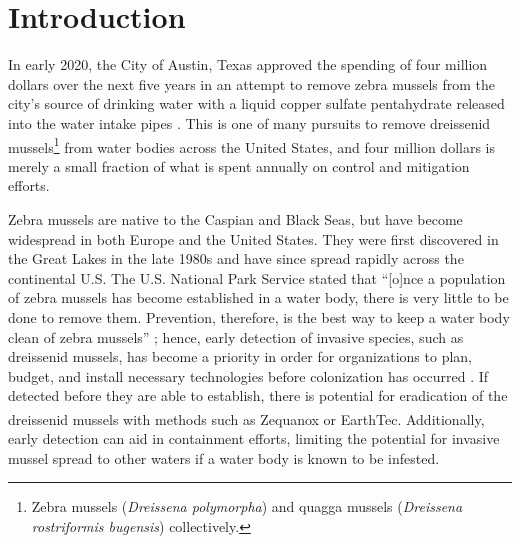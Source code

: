 \documentclass[12pt]{article}\usepackage[]{graphicx}\usepackage[]{color}
\begin{document}
\newpage

\doublespacing

\section{Introduction}

In early 2020, the City of Austin, Texas approved the spending of four million dollars over the next five years in an attempt to remove zebra mussels from the city's source of drinking water with a liquid copper sulfate pentahydrate released into the water intake pipes \cite{CBS:Austin}. This is one of many pursuits to remove dreissenid mussels\footnote{Zebra mussels (\textit{Dreissena polymorpha}) and quagga mussels (\textit{Dreissena rostriformis bugensis}) collectively.} from water bodies across the United States, and four million dollars is merely a small fraction of what is spent annually on control and mitigation efforts.

Zebra mussels are native to the Caspian and Black Seas, but have become widespread in both Europe and the United States. They were first discovered in the Great Lakes in the late 1980s and have since spread rapidly across the continental U.S. The U.S. National Park Service stated that ``[o]nce a population of zebra mussels has become established in a water body, there is very little to be done to remove them. Prevention, therefore, is the best way to keep a water body clean of zebra mussels'' \cite{NPS}; hence, early detection of invasive species, such as dreissenid mussels, has become a priority in order for organizations to plan, budget, and install necessary technologies before colonization has occurred \cite{Holser:body}. If detected before they are able to establish, there is potential for eradication of the dreissenid mussels with methods such as Zequanox\textsuperscript{\tiny\textregistered} or EarthTec\textsuperscript{\tiny\textregistered}. Additionally,  early detection can aid in containment efforts, limiting the potential for invasive mussel spread to other waters if a water body is known to be infested. 
\end{document}
